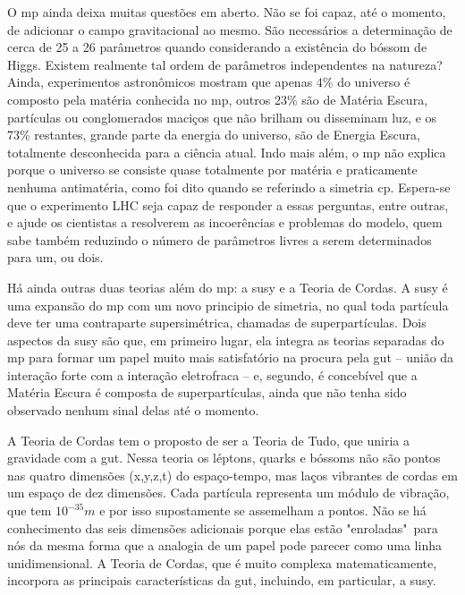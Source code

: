 O \gls{mp} ainda deixa muitas questões em aberto. Não se foi capaz, até o
momento, de adicionar o campo gravitacional ao mesmo. São necessários a
determinação de cerca de 25 a 26 parâmetros quando considerando a existência do
bóssom de Higgs. Existem realmente tal ordem de parâmetros independentes na
natureza? Ainda, experimentos astronômicos mostram que apenas 4\% do universo é
composto pela matéria conhecida no \gls{mp}, outros 23\% são de Matéria
Escura, partículas ou conglomerados maciços que não brilham ou disseminam luz,
e os 73\% restantes, grande parte da energia do universo, são de Energia Escura,
totalmente desconhecida para a ciência atual. Indo mais além, o \gls{mp} 
não explica porque o universo se consiste quase totalmente por matéria e
praticamente nenhuma antimatéria, como foi dito quando se referindo a simetria
\gls{cp}. Espera-se que o experimento LHC seja capaz de responder a essas perguntas, entre outras, 
e ajude os cientistas a resolverem as incoerências e problemas do modelo, quem sabe também reduzindo 
o número de parâmetros livres a serem determinados para um, ou dois.
\cite{nature_space_and_time,Intro_Nuclear}


Há ainda outras duas teorias além do \gls{mp}: a \gls{susy} e a Teoria de Cordas. 
A \gls{susy} é uma expansão do \gls{mp} com um
novo principio de simetria, no qual toda partícula deve ter uma contraparte
supersimétrica, chamadas de superpartículas. Dois aspectos da \gls{susy} são
que, em primeiro lugar, ela integra as teorias separadas do \gls{mp} para formar
um papel muito mais satisfatório na procura pela \gls{gut} -- união da interação
forte com a interação eletrofraca -- e, segundo, é concebível que a Matéria Escura 
é composta de superpartículas, ainda que não tenha sido observado nenhum sinal delas 
até o momento. 

A Teoria de Cordas tem o proposto de ser a Teoria de Tudo, que uniria a
gravidade com a \gls{gut}. Nessa teoria os léptons, quarks e bóssoms não são
pontos nas quatro dimensões (x,y,z,t) do espaço-tempo, mas laços vibrantes de
cordas em um espaço de dez dimensões. Cada partícula representa um módulo de
vibração, que tem $10^{-35} m$ e por isso supostamente se
assemelham a pontos. Não se há conhecimento das seis dimensões adicionais porque
elas estão "enroladas"~para nós da mesma forma que a analogia de um papel pode
parecer como uma linha unidimensional. A Teoria de Cordas, que é muito complexa
matematicamente, incorpora as principais características da \gls{gut}, incluindo,
em particular, a \gls{susy}.

